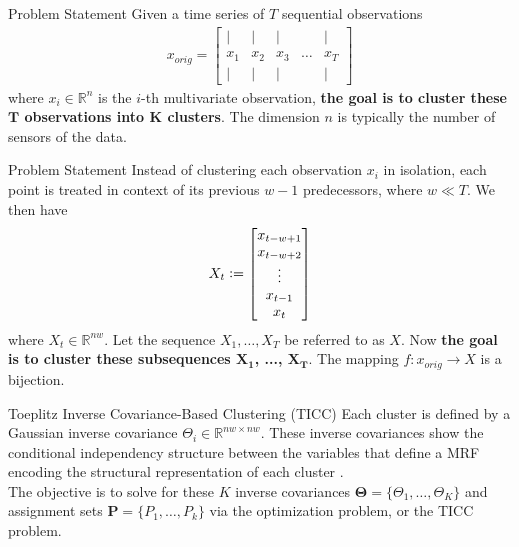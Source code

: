 \documentclass{beamer}
\newcommand{\defeq}{\vcentcolon=}
\begin{document}
\subsection{}

\begin{frame}{Problem Statement}
	Given a time series of $T$ sequential observations
	\begin{align*} 
	x_{orig} =
	\begin{bmatrix}
		|   &   |   &   |   &        &  |  \\
		x_1 &  x_2  &  x_3  &  \dots & x_T \\
		|   &   |   &   |   &        &  |  
	\end{bmatrix}
	\end{align*}
	where $x_i \in \mathbb{R}^n$ is the $i$-th multivariate observation, \textbf{the goal is to cluster these $\boldsymbol{T}$ observations into $\boldsymbol{K}$ clusters}. The dimension $n$ is typically the number of sensors of the data.
\end{frame}


\begin{frame}{Problem Statement}
	Instead of clustering each observation $x_i$ in isolation, each point is treated  in context of its previous $w - 1$ predecessors, where $w \ll T$. We then have
	\begin{align*}
		X_t \defeq
		\begin{bmatrix}
		x_{t-w+1} \\
		x_{t-w+2} \\
		\vdots \\
		x_{t-1} \\
		x_{t}
		\end{bmatrix}
	\end{align*}
	where $X_t \in \mathbb{R}^{nw}$. Let the sequence $X_1, \dots, X_T$ be referred to as $X$. Now \textbf{the goal is to cluster these subsequences $\boldsymbol{X_1}$, ..., $\boldsymbol{X_T}$}. The mapping $f:x_{orig} \rightarrow X$ is a bijection.
\end{frame}


\begin{frame}{Toeplitz Inverse Covariance-Based Clustering (TICC)}
	Each cluster is defined by a Gaussian inverse covariance $\Theta_i \in \mathbb{R}^{nw \times nw}$.  These inverse covariances show the conditional independency structure between the variables that define a MRF encoding the structural representation of each cluster \cite{26}. \\
	\vspace{.5cm}
	The objective is to solve for these $K$ inverse covariances $\boldsymbol{\Theta} = \{\Theta_1, \dots, \Theta_K\}$ and assignment sets $\boldsymbol{P} = \{P_1, \dots, P_k\}$ via the optimization problem, or the TICC problem.
\end{frame}
\end{document}
